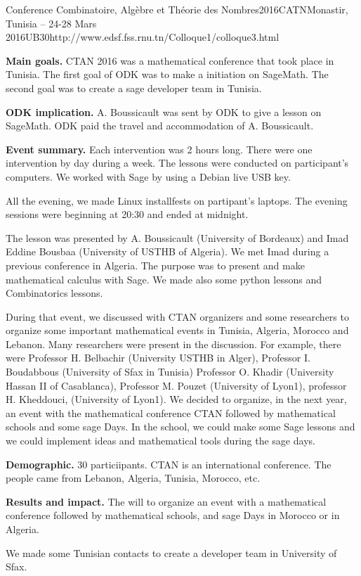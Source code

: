 \begin{event}{Conference Combinatoire, Algèbre et Théorie des Nombres}{2016CATN}{Monastir, Tunisia -- 24-28 Mars 2016}{UB}{30}{http://www.edsf.fss.rnu.tn/Colloque1/colloque3.html}

\textbf{Main goals.}
CTAN 2016 was a mathematical conference that took place in Tunisia.
The first goal of ODK was to make a initiation on SageMath. 
The second goal was to create a sage developer team in Tunisia.

\textbf{ODK implication.} A. Boussicault was sent by ODK to give a lesson on
SageMath. ODK paid the travel and accommodation of A. Boussicault.

\textbf{Event summary.}
Each intervention was 2 hours long. There were one intervention by day during 
a week. 
The lessons were conducted on participant's computers.
We worked with Sage by using a Debian live USB key.

All the evening, we made Linux installfests on partipant's laptops. 
The evening sessions were beginning at 20:30 and ended at midnight.

The lesson was presented by A. Boussicault (University of Bordeaux) and 
Imad Eddine Bousbaa (University of USTHB of Algeria). We met Imad during a 
previous conference in Algeria.
The purpose was to present and make mathematical calculus with Sage.
We made also some python lessons and Combinatorics lessons.

During that event, we discussed with CTAN organizers and some researchers 
to organize some important mathematical events in Tunisia, Algeria, Morocco and
Lebanon.
Many researchers were present in the discussion. For example, there were 
Professor H. Belbachir (University USTHB in Alger), 
Professor I. Boudabbous (University of Sfax in Tunisia)
Professor O. Khadir (University Hassan II of Casablanca),
Professor M. Pouzet (University of Lyon1),
professor H. Kheddouci, (University of Lyon1).
We decided to organize, in the next year, an event with the mathematical 
conference CTAN followed by mathematical schools and some sage Days.
In the school, we could make some Sage lessons and we could implement ideas 
and mathematical tools during the sage days.

\textbf{Demographic.} 30 particiipants. CTAN is an international conference. 
The people came from Lebanon, Algeria, Tunisia, Morocco, etc. 

\textbf{Results and impact.}
The will to organize an event with a mathematical conference 
followed by mathematical schools, and sage Days in Morocco or in Algeria.

We made some Tunisian contacts to create a developer team in University of 
Sfax.

\end{event}
